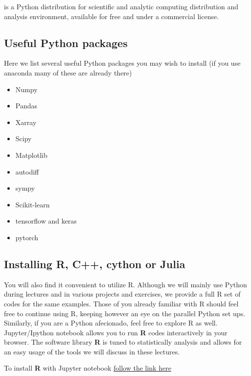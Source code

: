 \documentclass[%
oneside,                 %
final,                   %
10pt]{article}
\begin{document}
\noindent
is a Python
distribution for scientific and analytic computing distribution and
analysis environment, available for free and under a commercial
license.

\subsection*{Useful Python packages}
Here we list several useful Python packages you may wish to install (if you use anaconda many of these are already there)

\begin{itemize}
\item Numpy

\item Pandas

\item Xarray

\item Scipy

\item Matplotlib

\item autodiff

\item sympy

\item Scikit-learn

\item tensorflow and keras

\item pytorch
\end{itemize}

\noindent
\subsection*{Installing R, C++, cython or Julia}

You will also find it convenient to utilize R. Although we will mainly
use Python during lectures and in various projects and exercises, we
provide a full R set of codes for the same examples. Those of you
already familiar with R should feel free to continue using R, keeping
however an eye on the parallel Python set ups. Similarly, if you are a
Python afecionado, feel free to explore R as well.  Jupyter/Ipython
notebook allows you to run \textbf{R} codes interactively in your
browser. The software library \textbf{R} is tuned to statistically analysis
and allows for an easy usage of the tools we will discuss in these
lectures.

To install \textbf{R} with Jupyter notebook 
\href{{https://mpacer.org/maths/r-kernel-for-ipython-notebook}}{follow the link here}
\end{document}
